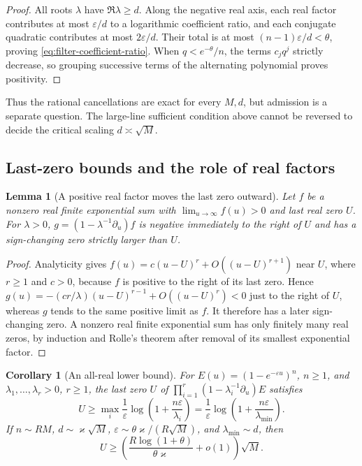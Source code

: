 \documentclass[11pt]{article}
\newtheorem{lemma}[theorem]{Lemma}
\newtheorem{corollary}[theorem]{Corollary}
\theoremstyle{definition}
\theoremstyle{remark}
\begin{document}
\begin{proof}
All roots $\lambda$ have $\Re\lambda\ge d$.  Along the negative
real axis, each real factor contributes at most $\varepsilon/d$
to a logarithmic coefficient ratio, and each conjugate quadratic
contributes at most $2\varepsilon/d$.  Their total is at most
$(n-1)\varepsilon/d<\theta$, proving
\eqref{eq:filter-coefficient-ratio}.  When
$q<e^{-\theta}/n$, the terms $c_jq^j$ strictly decrease, so grouping
successive terms of the alternating polynomial proves positivity.
\end{proof}

Thus the rational cancellations are exact for every $M,d$, but admission
is a separate question.  The large-line sufficient condition above
cannot be reversed to decide the critical scaling $d\asymp\sqrt M$.

\subsection{Last-zero bounds and the role of real factors}
\label{subsec:filter-last-zero}

\begin{lemma}[A positive real factor moves the last zero outward]
\label{lem:filter-real-factor-zero}
Let $f$ be a nonzero real finite exponential sum with
$\lim_{u\to\infty}f(u)>0$ and last real zero $U$.  For $\lambda>0$,
$g=(1-\lambda^{-1}\partial_u)f$ is negative immediately to the right
of $U$ and has a sign-changing zero strictly larger than $U$.
\end{lemma}

\begin{proof}
Analyticity gives $f(u)=c(u-U)^r+O((u-U)^{r+1})$ near $U$,
where $r\ge1$ and $c>0$, because $f$ is positive to the right of its
last zero.  Hence $g(u)=-(cr/\lambda)(u-U)^{r-1}+O((u-U)^r)<0$
just to the right of $U$, whereas $g$ tends to the same positive limit
as $f$.  It therefore has a later sign-changing zero.  A nonzero real
finite exponential sum has only finitely many real zeros, by induction
and Rolle's theorem after removal of its smallest exponential factor.
\end{proof}

\begin{corollary}[An all-real lower bound]
\label{cor:filter-all-real-last-zero}
For $E(u)=(1-e^{-\varepsilon u})^n$, $n\ge1$, and
$\lambda_1,\ldots,\lambda_r>0$, $r\ge1$, the last zero $U$ of
$\prod_{i=1}^r(1-\lambda_i^{-1}\partial_u)E$ satisfies
\begin{equation}
 U\ge\max_i\frac1\varepsilon\log\left(1+\frac{n\varepsilon}{\lambda_i}\right)
 =\frac1\varepsilon\log\left(1+\frac{n\varepsilon}{\lambda_{\min}}\right).
 \label{eq:filter-all-real-last-zero}
\end{equation}
If $n\sim RM$, $d\sim\varkappa\sqrt M$,
$\varepsilon\sim\theta\varkappa/(R\sqrt M)$, and
$\lambda_{\min}\sim d$, then
\begin{equation}
 U\ge\left(\frac{R\log(1+\theta)}{\theta\varkappa}+o(1)\right)\sqrt M.
 \label{eq:filter-all-real-critical}
\end{equation}
\end{corollary}
\end{document}
